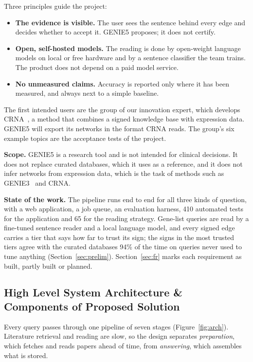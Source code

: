 \documentclass[11pt,a4paper]{article}
\newcommand{\gen}{GENIE5}
\begin{document}
Three principles guide the project:
\begin{itemize}
  \item \textbf{The evidence is visible.} The user sees the sentence behind every edge and decides
    whether to accept it. \gen{} proposes; it does not certify.
  \item \textbf{Open, self-hosted models.} The reading is done by open-weight language models on local
    or free hardware and by a sentence classifier the team trains. The product does not depend on
    a paid model service.
  \item \textbf{No unmeasured claims.} Accuracy is reported only where it has been measured, and
    always next to a simple baseline.
\end{itemize}

The first intended users are the group of our innovation expert, which develops CRNA~\cite{crna},
a method that combines a signed knowledge base with expression data. \gen{} will export its
networks in the format CRNA reads. The group's six example topics are the acceptance tests of the
project.

\textbf{Scope.} \gen{} is a research tool and is not intended for clinical decisions. It does
not replace curated databases, which it uses as a reference, and it does not infer networks from
expression data, which is the task of methods such as GENIE3~\cite{genie3} and CRNA.

\textbf{State of the work.} The pipeline runs end to end for all three kinds of question, with a
web application, a job queue, an evaluation harness, 410 automated tests for the application and
65 for the reading strategy. Gene-list queries are read by a fine-tuned sentence reader and a
local language model, and every signed edge carries a tier that says how far to trust its sign;
the signs in the most trusted tiers agree with the curated databases 94\% of the time on
queries never used to tune anything
(Section~\ref{sec:prelim}). Section~\ref{sec:fr} marks each requirement as built, partly built
or planned.

\subsection{High Level System Architecture \& Components of Proposed Solution}

Every query passes through one pipeline of seven stages (Figure~\ref{fig:arch}).
Literature retrieval and reading are slow, so the design separates \emph{preparation}, which
fetches and reads papers ahead of time, from \emph{answering}, which assembles what is stored.
\end{document}

